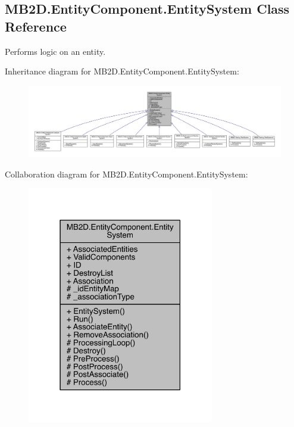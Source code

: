 \hypertarget{class_m_b2_d_1_1_entity_component_1_1_entity_system}{}\subsection{M\+B2\+D.\+Entity\+Component.\+Entity\+System Class Reference}
\label{class_m_b2_d_1_1_entity_component_1_1_entity_system}


Performs logic on an entity.  




Inheritance diagram for M\+B2\+D.\+Entity\+Component.\+Entity\+System\+:
\nopagebreak
\begin{figure}[H]
\begin{center}
\leavevmode
\includegraphics[width=350pt]{class_m_b2_d_1_1_entity_component_1_1_entity_system__inherit__graph}
\end{center}
\end{figure}


Collaboration diagram for M\+B2\+D.\+Entity\+Component.\+Entity\+System\+:
\nopagebreak
\begin{figure}[H]
\begin{center}
\leavevmode
\includegraphics[width=231pt]{class_m_b2_d_1_1_entity_component_1_1_entity_system__coll__graph}
\end{center}
\end{figure}
